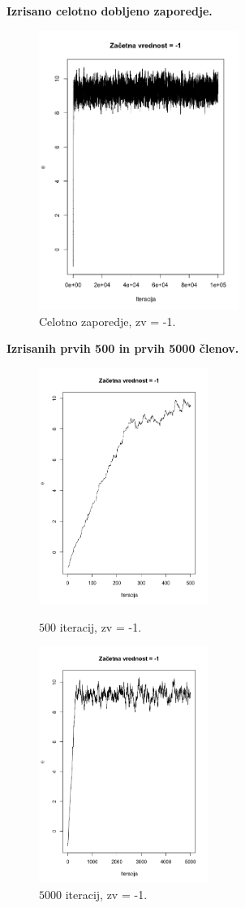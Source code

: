 \documentclass[a4paper,11pt]{article}
\begin{document}
\noindent
\textbf{Izrisano celotno dobljeno zaporedje.}
    \begin{figure}[ht!]
        \centering
        \includegraphics[width = 65mm]{Slike/3_1.png}
        \caption{Celotno zaporedje, zv = -1.}
    \end{figure}
\newpage
\noindent
\textbf{Izrisanih prvih 500 in prvih 5000 členov.}
    \begin{figure}[ht!]
        \begin{minipage}{0.5\textwidth}
            \centering
            \includegraphics[width = 55mm]{Slike/3_2.png}
            \caption{$500$ iteracij, zv = -1.}
        \end{minipage}
        \begin{minipage}{0.5\textwidth}
            \centering
            \includegraphics[width = 55mm]{Slike/3_2_5000.png}
            \caption{$5000$ iteracij, zv = -1.}
        \end{minipage}
    \end{figure}
\end{document}
